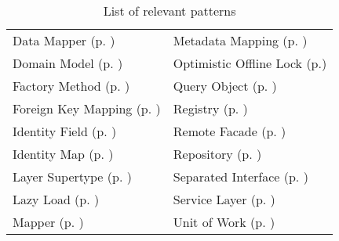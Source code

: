 \begin{longtable}{l|l}
	\caption{\label{tab:patternsUsedPatterns} List of relevant patterns}\\
		Data Mapper (p. \pageref{subsec:dataMapper})								&Metadata Mapping (p. \pageref{subsec:metadataMapping})\\
		Domain Model (p. \pageref{subsec:domainModel})							&Optimistic Offline Lock 																																																				 (p.\pageref{subsec:optimisticOfflineLock})\\
		Factory Method (p. \pageref{subsec:factoryMethod})					&Query Object (p. \pageref{subsec:queryObject})\\
		Foreign Key Mapping (p. \pageref{subsec:foreignKeyMapping})	&Registry (p. \pageref{subsec:registry})\\
		Identity Field (p. \pageref{subsec:identityField})					&Remote Facade (p. \pageref{subsec:remoteFacade})\\
		Identity Map (p. \pageref{subsec:identityMap})							&Repository (p. \pageref{subsec:repository})\\
		Layer Supertype (p. \pageref{subsec:layerSupertype})				&Separated Interface (p. \pageref{subsec:separatedInterface})\\
		Lazy Load (p. \pageref{subsec:lazyLoad})										&Service Layer (p. \pageref{subsec:serviceLayer})\\
		Mapper (p. \pageref{subsec:mapper})													&Unit of Work (p. \pageref{subsec:unitOfWork})\\
\end{longtable}